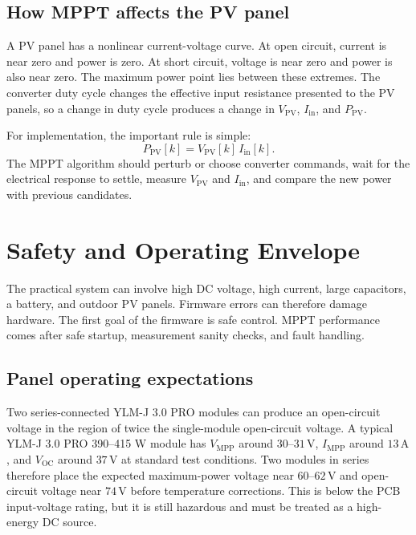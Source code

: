 \documentclass[11pt,a4paper]{article}
\newcommand{\Pin}{P_{\mathrm{PV}}}
\newcommand{\Iin}{I_{\mathrm{in}}}
\newcommand{\Vpv}{V_{\mathrm{PV}}}
\let\originalsection\section
\renewcommand{\section}{\clearpage\originalsection}
\begin{document}
\subsection{How MPPT affects the PV panel}

A PV panel has a nonlinear current-voltage curve. At open circuit, current is near zero and power is zero. At short circuit, voltage is near zero and power is also near zero. The maximum power point lies between these extremes. The converter duty cycle changes the effective input resistance presented to the PV panels, so a change in duty cycle produces a change in $\Vpv$, $\Iin$, and $\Pin$.

For implementation, the important rule is simple:
\begin{equation}
  \Pin[k] = \Vpv[k]\,\Iin[k].
\end{equation}
The MPPT algorithm should perturb or choose converter commands, wait for the electrical response to settle, measure $\Vpv$ and $\Iin$, and compare the new power with previous candidates.

\section{Safety and Operating Envelope}

The practical system can involve high DC voltage, high current, large capacitors, a battery, and outdoor PV panels. Firmware errors can therefore damage hardware. The first goal of the firmware is safe control. MPPT performance comes after safe startup, measurement sanity checks, and fault handling.

\subsection{Panel operating expectations}

Two series-connected YLM-J 3.0 PRO modules can produce an open-circuit voltage in the region of twice the single-module open-circuit voltage. A typical YLM-J 3.0 PRO 390--415 W module has $V_{\mathrm{MPP}}$ around $30$--$31\,\mathrm{V}$, $I_{\mathrm{MPP}}$ around $13\,\mathrm{A}$, and $V_{\mathrm{OC}}$ around $37\,\mathrm{V}$ at standard test conditions. Two modules in series therefore place the expected maximum-power voltage near $60$--$62\,\mathrm{V}$ and open-circuit voltage near $74\,\mathrm{V}$ before temperature corrections. This is below the PCB input-voltage rating, but it is still hazardous and must be treated as a high-energy DC source.
\end{document}

